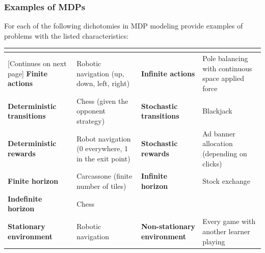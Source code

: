 \subsubsection{Examples of MDPs}
    For each of the following dichotomies in MDP modeling provide examples of problems with the listed characteristics:
    \begin{tabularx}{\linewidth}{X|X|X|X}
        \toprule
        \endfirsthead
        \toprule
        \textbf{} & \textbf{} & \textbf{} & \textbf{}\\
        \midrule
        \endhead
        \footnotesize [Continues on next page]
        \endfoot
        \bottomrule
        \endlastfoot
        \textbf{Finite actions} & Robotic navigation (up, down, left, right) & \textbf{Infinite actions} & Pole balancing with continuous space applied force\\ \midrule
        \textbf{Deterministic transitions} & Chess (given the opponent strategy) & \textbf{Stochastic transitions} & Blackjack\\ \midrule
        \textbf{Deterministic rewards} & Robot navigation (0 everywhere, 1 in the exit point) & \textbf{Stochastic rewards} & Ad banner allocation (depending on clicks)\\ \midrule
        \textbf{Finite horizon} & Carcassone (finite number of tiles) & \textbf{Infinite horizon} & Stock exchange\\ \midrule
        \textbf{Indefinite horizon} & Chess & & \\ \midrule
        \textbf{Stationary environment} & Robotic navigation & \textbf{Non-stationary environment} & Every game with another learner playing
    \end{tabularx}

